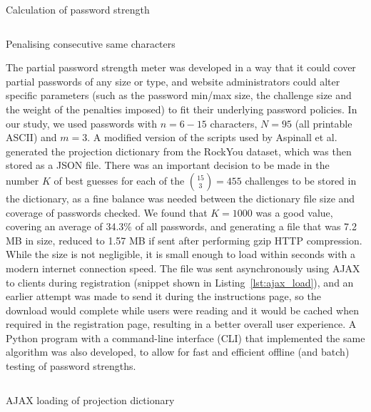   \begin{listing}[htpb]
    \inputminted[linenos,frame=lines,baselinestretch=0.75,fontsize=\footnotesize]{js}{Snippets/calc_str.js}
    \caption{Calculation of password strength}
    \label{lst:calc_str}
  \end{listing}

  \begin{listing}[htpb]
    \inputminted[linenos,frame=lines,baselinestretch=0.75,fontsize=\footnotesize]{js}{Snippets/get_penalty.js}
    \caption{Penalising consecutive same characters}
    \label{lst:penalty}
  \end{listing}

  The partial password strength meter was developed in a way that it could cover partial passwords of any size or type, and website administrators could alter specific parameters (such as the password min/max size, the challenge size and the weight of the penalties imposed) to fit their underlying password policies. In our study, we used passwords with $n=6-15$ characters, $N=95$ (all printable ASCII) and $m=3$.
  A modified version of the scripts used by Aspinall et al.~\cite{part_pass} generated the projection dictionary from the RockYou dataset, which was then stored as a JSON file. There was an important decision to be made in the number $K$ of best guesses for each of the ${15 \choose 3} = 455$ challenges to be stored in the dictionary, as a fine balance was needed between the dictionary file size and coverage of passwords checked. We found that $K=1000$ was a good value, covering an average of 34.3\% of all passwords, and generating a file that was 7.2 MB in size, reduced to 1.57 MB if sent after performing gzip HTTP compression. While the size is not negligible, it is small enough to load within seconds with a modern internet connection speed. The file was sent asynchronously using AJAX to clients during registration (snippet shown in Listing~\ref{lst:ajax_load}), and an earlier attempt was made to send it during the instructions page, so the download would complete while users were reading and it would be cached when required in the registration page, resulting in a better overall user experience. A Python program with a command-line interface (CLI) that implemented the same algorithm was also developed, to allow for fast and efficient offline (and batch) testing of password strengths.

  \begin{listing}[htpb]
    \inputminted[linenos,frame=lines,baselinestretch=0.75,fontsize=\footnotesize]{js}{Snippets/ajax.js}
    \caption{AJAX loading of projection dictionary}
    \label{lst:ajax_load}
  \end{listing}

